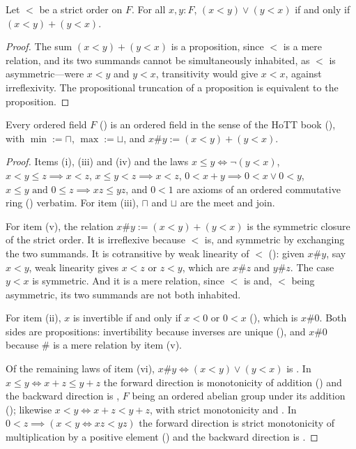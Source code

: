 \begin{lemma}[\agda{<∨>≃<⊎>}]
  \label{ltOrGtIffLtSumGt}
  Let $<$ be a strict order on $F$. For all $x, y : F$, $(x < y) \lor (y < x)$ if and only if $(x < y) + (y < x)$.
\end{lemma}
\begin{proof}
  The sum $(x < y) + (y < x)$ is a proposition, since $<$ is a mere relation, and its two summands cannot be simultaneously inhabited, as $<$ is asymmetric---were $x < y$ and $y < x$, transitivity would give $x < x$, against irreflexivity. The propositional truncation of a proposition is equivalent to the proposition.
\end{proof}

\begin{theorem}
  \label{IsOrderedFieldToIsOrderedFieldBook}
  Every ordered field $F$ () is an ordered field in the sense of the HoTT book (), with $\min := \sqcap$, $\max := \sqcup$, and $x \# y := (x < y) + (y < x)$.
\end{theorem}
\begin{proof}
  Items (i), (iii) and (iv) and the laws $x \le y \iff \neg(y < x)$, $x < y \le z \implies x < z$, $x \le y < z \implies x < z$, $0 < x + y \implies 0 < x \lor 0 < y$, $x \le y \text{ and } 0 \le z \implies xz \le yz$, and $0 < 1$ are axioms of an ordered commutative ring () verbatim. For item (iii), $\sqcap$ and $\sqcup$ are the meet and join.

  For item (v), the relation $x \# y := (x < y) + (y < x)$ is the symmetric closure of the strict order. It is irreflexive because $<$ is, and symmetric by exchanging the two summands. It is cotransitive by weak linearity of $<$ (): given $x \# y$, say $x < y$, weak linearity gives $x < z$ or $z < y$, which are $x \# z$ and $y \# z$. The case $y < x$ is symmetric. And it is a mere relation, since $<$ is and, $<$ being asymmetric, its two summands are not both inhabited.

  For item (ii), $x$ is invertible if and only if $x < 0$ or $0 < x$ (), which is $x \# 0$. Both sides are propositions: invertibility because inverses are unique (), and $x \# 0$ because $\#$ is a mere relation by item (v).

  Of the remaining laws of item (vi), $x \# y \iff (x < y) \lor (y < x)$ is . In $x \le y \iff x + z \le y + z$ the forward direction is monotonicity of addition () and the backward direction is , $F$ being an ordered abelian group under its addition (); likewise $x < y \iff x + z < y + z$, with strict monotonicity and . In $0 < z \implies (x < y \iff xz < yz)$ the forward direction is strict monotonicity of multiplication by a positive element () and the backward direction is .
\end{proof}

